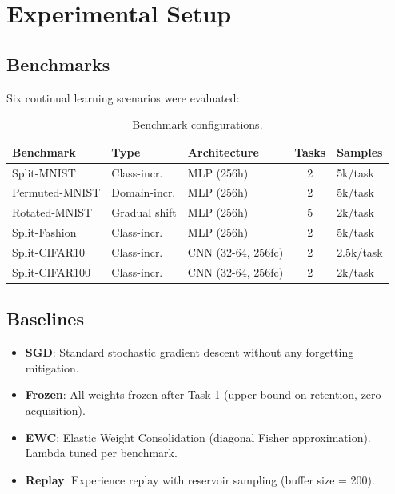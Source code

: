 \documentclass[11pt,a4paper]{article}
\begin{document}
\section{Experimental Setup}

\subsection{Benchmarks}

Six continual learning scenarios were evaluated:

\begin{table}[htbp]
\centering
\caption{Benchmark configurations.}
\begin{tabular}{lllc l}
\toprule
Benchmark & Type & Architecture & Tasks & Samples \\
\midrule
Split-MNIST & Class-incr. & MLP (256h) & 2 & 5k/task \\
Permuted-MNIST & Domain-incr. & MLP (256h) & 2 & 5k/task \\
Rotated-MNIST & Gradual shift & MLP (256h) & 5 & 2k/task \\
Split-Fashion & Class-incr. & MLP (256h) & 2 & 5k/task \\
Split-CIFAR10 & Class-incr. & CNN (32-64, 256fc) & 2 & 2.5k/task \\
Split-CIFAR100 & Class-incr. & CNN (32-64, 256fc) & 2 & 2k/task \\
\bottomrule
\end{tabular}
\end{table}

\subsection{Baselines}

\begin{itemize}
    \item \textbf{SGD}: Standard stochastic gradient descent without any forgetting mitigation.
    \item \textbf{Frozen}: All weights frozen after Task 1 (upper bound on retention, zero acquisition).
    \item \textbf{EWC}: Elastic Weight Consolidation (diagonal Fisher approximation). Lambda tuned per benchmark.
    \item \textbf{Replay}: Experience replay with reservoir sampling (buffer size = 200).
\end{itemize}
\end{document}
